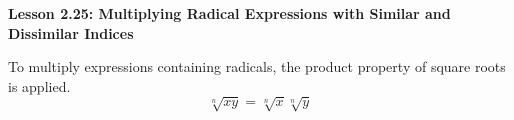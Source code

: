 \begin{center}
\textbf{Lesson 2.25: Multiplying Radical Expressions with Similar and Dissimilar Indices}
\end{center}

\vspace*{-1.5ex}

To multiply expressions containing radicals, the product property of square roots is applied.
\[\sqrt[{\scriptstyle n}]{xy} = \sqrt[{\scriptstyle n}]{x}\sqrt[{\scriptstyle n}]{y}\]
